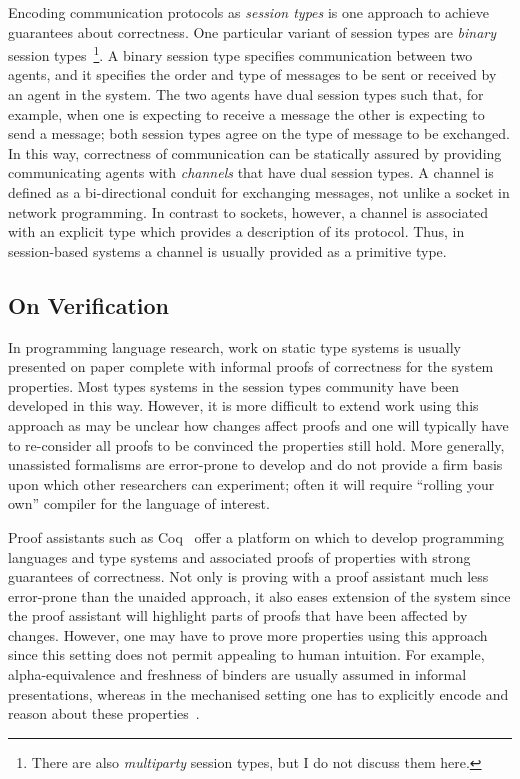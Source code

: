 \documentclass{mprop}
\begin{document}
Encoding communication protocols as \textit{session types} is one approach to achieve guarantees about correctness. One particular variant of session types are \textit{binary} session types~\footnote{There are also \textit{multiparty} session types, but I do not discuss them here.}. A binary session type specifies communication between two agents, and it specifies the order and type of messages to be sent or received by an agent in the system. The two agents have dual session types such that, for example, when one is expecting to receive a message the other is expecting to send a message; both session types agree on the type of message to be exchanged. In this way, correctness of communication can be statically assured by providing communicating agents with \textit{channels} that have dual session types. A channel is defined as a bi-directional conduit for exchanging messages, not unlike a socket in network programming. In contrast to sockets, however, a channel is associated with an explicit type which provides a description of its protocol. Thus, in session-based systems a channel is usually provided as a primitive type.

\subsection{On Verification}

In programming language research, work on static type systems is usually presented on paper complete with informal proofs of correctness for the system properties. Most types systems in the session types community have been developed in this way. However, it is more difficult to extend work using this approach as may be unclear how changes affect proofs and one will typically have to re-consider all proofs to be convinced the properties still hold. More generally, unassisted formalisms are error-prone to develop and do not provide a firm basis upon which other researchers can experiment; often it will require ``rolling your own'' compiler for the language of interest.

Proof assistants such as Coq~\cite{Coq:manual} offer a platform on which to develop programming languages and type systems and associated proofs of properties with strong guarantees of correctness. Not only is proving with a proof assistant much less error-prone than the unaided approach, it also eases extension of the system since the proof assistant will highlight parts of proofs that have been affected by changes. However, one may have to prove more properties using this approach since this setting does not permit appealing to human intuition. For example, alpha-equivalence and freshness of binders are usually assumed in informal presentations, whereas in the mechanised setting one has to explicitly encode and reason about these properties~\cite{Aydemir:2005:MMM, Aydemir:2008:EFM}.
\end{document}
